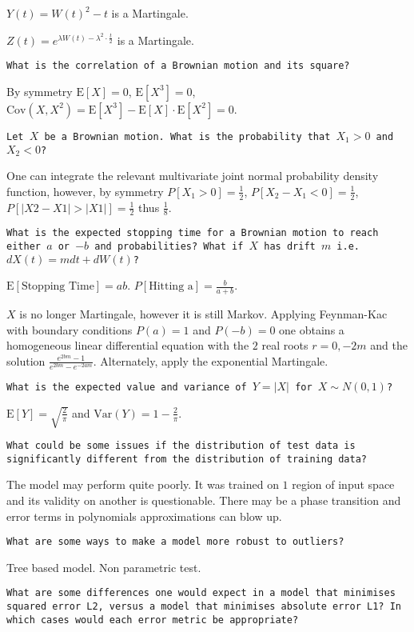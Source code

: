 $Y(t) = W(t)^2 - t$ is a Martingale.

$Z(t) = e^{\lambda W(t) - \lambda^2 \cdot \frac{t}{2}}$ is a Martingale.

\texttt{What is the correlation of a Brownian motion and its square?}

By symmetry $\text{E}[X] = 0$, $\text{E}[X^3] = 0$, $\text{Cov}(X,X^2) = \text{E}[X^3]-\text{E}[X] \cdot \text{E}[X^2] = \boxed{0}$.

\texttt{Let $X$ be a Brownian motion. What is the probability that $X_1>0$ and $X_2<0$?}

One can integrate the relevant multivariate joint normal probability density function, however, by symmetry $P[X_1>0]=\frac{1}{2}$, $P[X_2-X_1<0]=\frac{1}{2}$, $P[|X2-X1|>|X1|]=\frac{1}{2}$ thus $\boxed{\frac{1}{8}}$.

\texttt{What is the expected stopping time for a Brownian motion to reach either $a$ or $-b$ and probabilities? What if $X$ has drift $m$ i.e. $dX(t)=m dt+d W(t)$?}

$\text{E}[\text{Stopping Time}]=\boxed{ab}$. $P[\text{Hitting a}]=\boxed{\frac{b}{a+b}}$.

$X$ is no longer Martingale, however it is still Markov. Applying Feynman-Kac with boundary conditions $P(a)=1$ and $P(-b)=0$ one obtains a homogeneous linear differential equation with the $2$ real roots $r = 0,-2m$ and the solution $\boxed{\frac{e^{2bm}-1}{e^{2bm}-e^{-2am}}}$. Alternately, apply the exponential Martingale.

\texttt{What is the expected value and variance of $Y=|X|$ for $X \sim N(0,1)$?}

$\text{E}[Y]=\boxed{\sqrt{\frac{2}{\pi}}}$ and $\text{Var}(Y)=\boxed{1-\frac{2}{\pi}}$.

\texttt{What could be some issues if the distribution of test data is significantly different from the distribution of training data?}

The model may perform quite poorly. It was trained on $1$ region of input space and its validity on another is questionable. There may be a phase transition and error terms in polynomials approximations can blow up.

\texttt{What are some ways to make a model more robust to outliers?}

Tree based model. Non parametric test.

\texttt{What are some differences one would expect in a model that minimises squared error L2, versus a model that minimises absolute error L1? In which cases would each error metric be appropriate?}


